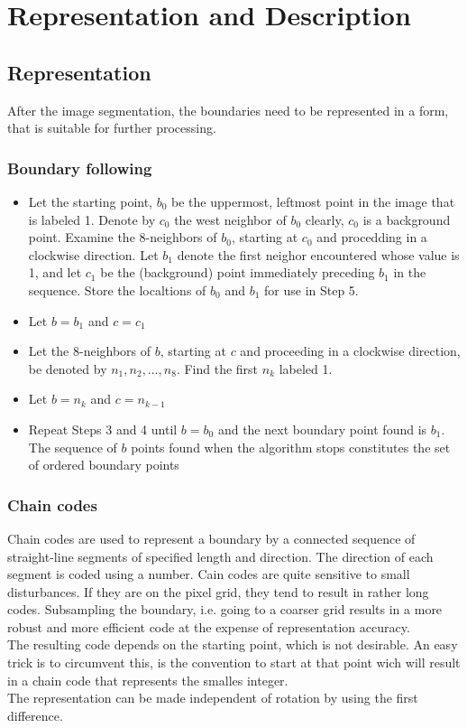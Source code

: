 \section{Representation and Description}
\label{sec:representationDescription}
\subsection{Representation}
After the image segmentation, the boundaries need to be represented in a form, that is suitable for further processing.
\subsubsection{Boundary following}
\begin{itemize}
\item Let the starting point, $b_0$ be the uppermost, leftmost point in the image that is labeled 1. Denote by $c_0$ the west neighbor of $b_0$ clearly, $c_0$ is a background point. Examine the 8-neighbors of $b_0$, starting at $c_0$ and procedding in a clockwise direction. Let $b_1$ denote the first neighor encountered whose value is 1, and let $c_1$ be the (background) point immediately preceding $b_1$ in the sequence. Store the localtions of $b_0$ and $b_1$ for use in Step 5.
\item Let $b=b_1$ and $c=c_1$
\item Let the 8-neighbors of $b$, starting at $c$ and proceeding in a clockwise direction, be denoted by $n_1,n_2,\ldots,n_8$. Find the first $n_k$ labeled 1.
\item Let $b=n_k$ and $c=n_{k-1}$
\item Repeat Steps 3 and 4 until $b=b_0$ and the next boundary point found is $b_1$. The sequence of $b$ points found when the algorithm stops constitutes the set of ordered boundary points
\end{itemize}
\subsubsection{Chain codes}
Chain codes are used to represent a boundary by a connected sequence of straight-line segments of specified length and direction. The direction of each segment is coded using a number.
Cain codes are quite sensitive to small disturbances. If they are on the pixel grid, they tend to result in rather long codes. Subsampling the boundary, i.e. going to a coarser grid results in a more robust and more efficient code at the expense of representation accuracy.\\
The resulting code depends on the starting point, which is not desirable. An easy trick is to circumvent this, is the convention to start at that point wich will result in a chain code that represents the smalles integer.\\
The representation can be made independent of rotation by using the first difference.
